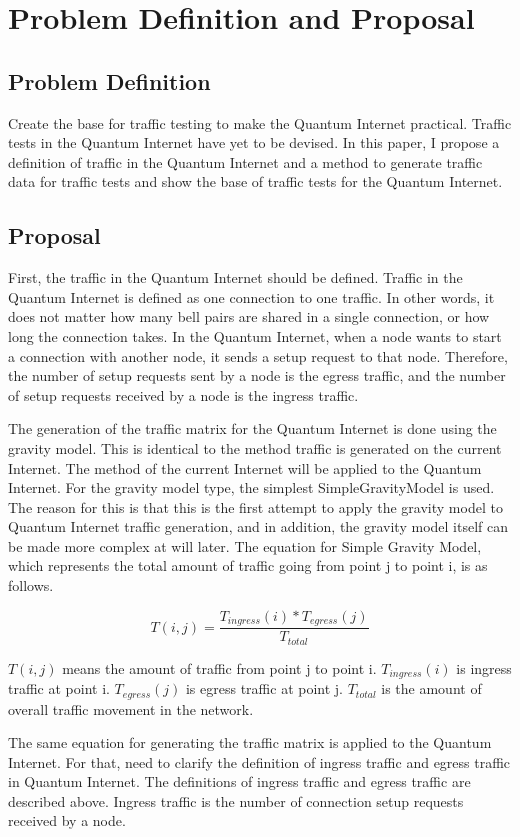 \chapter{Problem Definition and Proposal}
\label{problem_definition_and_proposal}

\section{Problem Definition}
Create the base for traffic testing to make the Quantum Internet practical. 
Traffic tests in the Quantum Internet have yet to be devised. 
In this paper, I propose a definition of traffic in the Quantum Internet and a method to generate traffic data for traffic tests and show the base of traffic tests for the Quantum Internet.

\section{Proposal}
First, the traffic in the Quantum Internet should be defined. 
Traffic in the Quantum Internet is defined as one connection to one traffic. 
In other words, it does not matter how many bell pairs are shared in a single connection, or how long the connection takes.
In the Quantum Internet, when a node wants to start a connection with another node, it sends a setup request to that node.
Therefore, the number of setup requests sent by a node is the egress traffic, and the number of setup requests received by a node is the ingress traffic.

The generation of the traffic matrix for the Quantum Internet is done using the gravity model. 
This is identical to the method traffic is generated on the current Internet. 
The method of the current Internet will be applied to the Quantum Internet.
For the gravity model type, the simplest SimpleGravityModel is used.
The reason for this is that this is the first attempt to apply the gravity model to Quantum Internet traffic generation, and in addition, the gravity model itself can be made more complex at will later.
The equation for Simple Gravity Model\cite{zhang2003fast}, which represents the total amount of traffic going from point j to point i, is as follows.
\begin{screen}
    \begin{dfn}
        \begin{equation}
            T(i,j) = \frac{T_{ingress}(i)*T_{egress}(j)}{T_{total}}
        \end{equation}
    \end{dfn}
    $T(i,j)$ means the amount of traffic from point j to point i. 
    $T_{ingress}(i)$ is ingress traffic at point i.
    $T_{egress}(j)$ is egress traffic at point j.
    $T_{total}$ is the amount of overall traffic movement in the network.
\end{screen}
The same equation for generating the traffic matrix is applied to the Quantum Internet. 
For that, need to clarify the definition of ingress traffic and egress traffic in Quantum Internet.
The definitions of ingress traffic and egress traffic are described above. 
Ingress traffic is the number of connection setup requests received by a node. 

